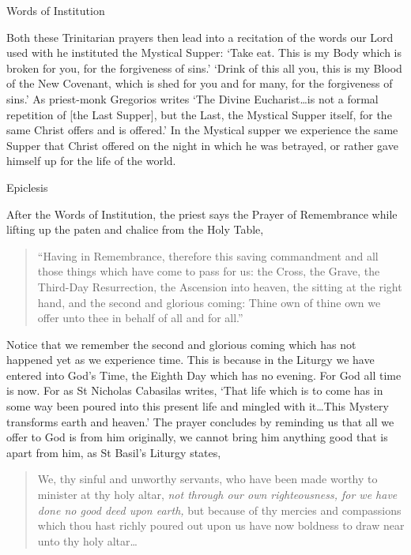 \documentclass[
]{article}
\begin{document}
Words of Institution

Both these Trinitarian prayers then lead into a recitation of the words
our Lord used with he instituted the Mystical Supper: `Take eat. This is
my Body which is broken for you, for the forgiveness of sins.' `Drink of
this all you, this is my Blood of the New Covenant, which is shed for
you and for many, for the forgiveness of sins.' As priest-monk Gregorios
writes `The Divine Eucharist\ldots is not a formal repetition of {[}the
Last Supper{]}, but the Last, the Mystical Supper itself, for the same
Christ offers and is offered.' In the Mystical supper we experience the
same Supper that Christ offered on the night in which he was betrayed,
or rather gave himself up for the life of the world.

Epiclesis

After the Words of Institution, the priest says the Prayer of
Remembrance while lifting up the paten and chalice from the Holy Table,

\begin{quote}
``Having in Remembrance, therefore this saving commandment and all those
things which have come to pass for us: the Cross, the Grave, the
Third-Day Resurrection, the Ascension into heaven, the sitting at the
right hand, and the second and glorious coming: Thine own of thine own
we offer unto thee in behalf of all and for all.''
\end{quote}

Notice that we remember the second and glorious coming which has not
happened yet as we experience time. This is because in the Liturgy we
have entered into God's Time, the Eighth Day which has no evening. For
God all time is now. For as St Nicholas Cabasilas writes, `That life
which is to come has in some way been poured into this present life and
mingled with it\ldots This Mystery transforms earth and heaven.' The
prayer concludes by reminding us that all we offer to God is from him
originally, we cannot bring him anything good that is apart from him, as
St Basil's Liturgy states,

\begin{quote}
We, thy sinful and unworthy servants, who have been made worthy to
minister at thy holy altar, \emph{not through our own righteousness, for
we have done no good deed upon earth,} but because of thy mercies and
compassions which thou hast richly poured out upon us have now boldness
to draw near unto thy holy altar\ldots{}
\end{quote}
\end{document}
